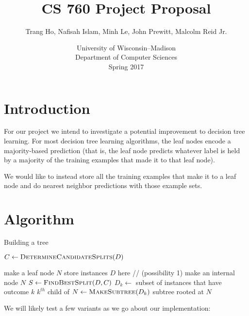 \documentclass[10pt]{article}
\title{CS 760 Project Proposal}
\author{Trang Ho, Nafisah Islam, Minh Le, John Prewitt, Malcolm Reid Jr.}
\date{University of Wisconsin--Madison\\Department of Computer Sciences\\Spring 2017}
\begin{document}
\setlength{\baselineskip}{18pt}
\maketitle

\section{Introduction}
For our project we intend to investigate a potential improvement to decision tree learning. For most decision tree learning algorithms, the leaf nodes encode a majority-based prediction (that is, the leaf node predicts whatever label is held by a majority of the training examples that made it to that leaf node).  

We would like to instead store all the training examples that make it to a leaf node and do nearest neighbor predictions with those example sets.

\section{Algorithm}
\begin{algorithm}
\caption{Building a tree}\label{euclid}
\begin{algorithmic}[1]

\State $C \gets \Call{DetermineCandidateSplits}{D}$

	\State make a leaf node $N$ 
	\State store instances $D$ here  // (possibility 1)
\Else
	\State make an internal node $N$ 
	\State $S \gets \Call{FindBestSplit}{D, C}$
		\State $D_k \gets$ subset of instances that have outcome $k$ 
		\State $k^{th}$ child of $N \gets \Call{MakeSubtree}{D_k}$
	\EndFor
\EndIf
\Return subtree rooted at $N$
\EndFunction
\end{algorithmic}
\end{algorithm}

We will likely test a few variants as we go about our implementation:
\end{document}
